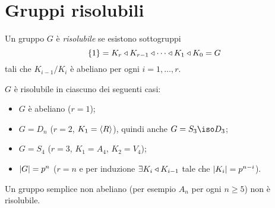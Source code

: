 
\section{Gruppi risolubili}

\begin{defi}
Un gruppo $G$ è {\em risolubile} se esistono sottogruppi
\[
\{1\}=K_r \triangleleft K_{r-1} \triangleleft\cdots \triangleleft K_1 \triangleleft K_0=G
\]
tali che $K_{i-1}/K_i$ è abeliano per ogni $i=1,\dots,r$.
\end{defi}
\begin{esem}
$G$ è risolubile in ciascuno dei seguenti casi:
\begin{itemize}
\item $G$ è abeliano ($r=1$);
\item $G=D_n$ ($r=2$, $K_1=\left\langle R\right\rangle$), quindi anche $G=S_3\iso D_3$;
\item $G=S_4$ ($r=3$, $K_1=A_4$, $K_2=V_4$);
\item $\left\lvert G\right\rvert=p^n$ ($r=n$ e per induzione $\exists K_i \triangleleft K_{i-1}$ tale che $\left\lvert K_i\right\rvert=p^{n-i}$).
\end{itemize}
Un gruppo semplice non abeliano (per esempio $A_n$ per ogni $n\ge5$) non è risolubile.
\end{esem}



